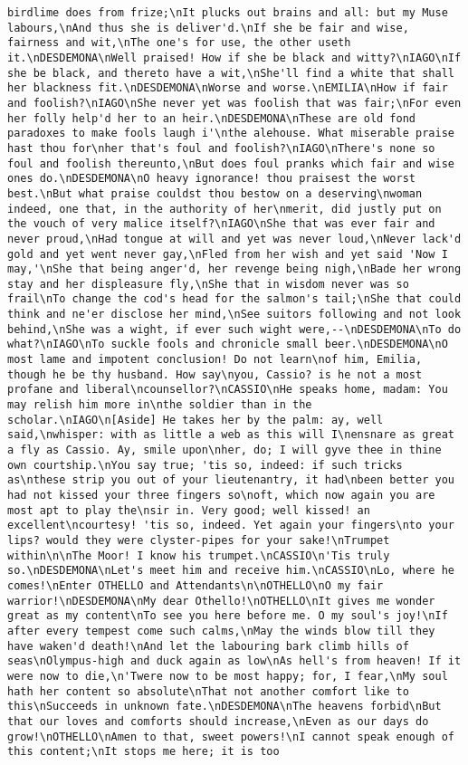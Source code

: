 \begin{verbatim}
birdlime does from frize;\nIt plucks out brains and all: but my Muse labours,\nAnd thus she is deliver'd.\nIf she be fair and wise, fairness and wit,\nThe one's for use, the other useth it.\nDESDEMONA\nWell praised! How if she be black and witty?\nIAGO\nIf she be black, and thereto have a wit,\nShe'll find a white that shall her blackness fit.\nDESDEMONA\nWorse and worse.\nEMILIA\nHow if fair and foolish?\nIAGO\nShe never yet was foolish that was fair;\nFor even her folly help'd her to an heir.\nDESDEMONA\nThese are old fond paradoxes to make fools laugh i'\nthe alehouse. What miserable praise hast thou for\nher that's foul and foolish?\nIAGO\nThere's none so foul and foolish thereunto,\nBut does foul pranks which fair and wise ones do.\nDESDEMONA\nO heavy ignorance! thou praisest the worst best.\nBut what praise couldst thou bestow on a deserving\nwoman indeed, one that, in the authority of her\nmerit, did justly put on the vouch of very malice itself?\nIAGO\nShe that was ever fair and never proud,\nHad tongue at will and yet was never loud,\nNever lack'd gold and yet went never gay,\nFled from her wish and yet said 'Now I may,'\nShe that being anger'd, her revenge being nigh,\nBade her wrong stay and her displeasure fly,\nShe that in wisdom never was so frail\nTo change the cod's head for the salmon's tail;\nShe that could think and ne'er disclose her mind,\nSee suitors following and not look behind,\nShe was a wight, if ever such wight were,--\nDESDEMONA\nTo do what?\nIAGO\nTo suckle fools and chronicle small beer.\nDESDEMONA\nO most lame and impotent conclusion! Do not learn\nof him, Emilia, though he be thy husband. How say\nyou, Cassio? is he not a most profane and liberal\ncounsellor?\nCASSIO\nHe speaks home, madam: You may relish him more in\nthe soldier than in the scholar.\nIAGO\n[Aside] He takes her by the palm: ay, well said,\nwhisper: with as little a web as this will I\nensnare as great a fly as Cassio. Ay, smile upon\nher, do; I will gyve thee in thine own courtship.\nYou say true; 'tis so, indeed: if such tricks as\nthese strip you out of your lieutenantry, it had\nbeen better you had not kissed your three fingers so\noft, which now again you are most apt to play the\nsir in. Very good; well kissed! an excellent\ncourtesy! 'tis so, indeed. Yet again your fingers\nto your lips? would they were clyster-pipes for your sake!\nTrumpet within\n\nThe Moor! I know his trumpet.\nCASSIO\n'Tis truly so.\nDESDEMONA\nLet's meet him and receive him.\nCASSIO\nLo, where he comes!\nEnter OTHELLO and Attendants\n\nOTHELLO\nO my fair warrior!\nDESDEMONA\nMy dear Othello!\nOTHELLO\nIt gives me wonder great as my content\nTo see you here before me. O my soul's joy!\nIf after every tempest come such calms,\nMay the winds blow till they have waken'd death!\nAnd let the labouring bark climb hills of seas\nOlympus-high and duck again as low\nAs hell's from heaven! If it were now to die,\n'Twere now to be most happy; for, I fear,\nMy soul hath her content so absolute\nThat not another comfort like to this\nSucceeds in unknown fate.\nDESDEMONA\nThe heavens forbid\nBut that our loves and comforts should increase,\nEven as our days do grow!\nOTHELLO\nAmen to that, sweet powers!\nI cannot speak enough of this content;\nIt stops me here; it is too 
\end{verbatim}
